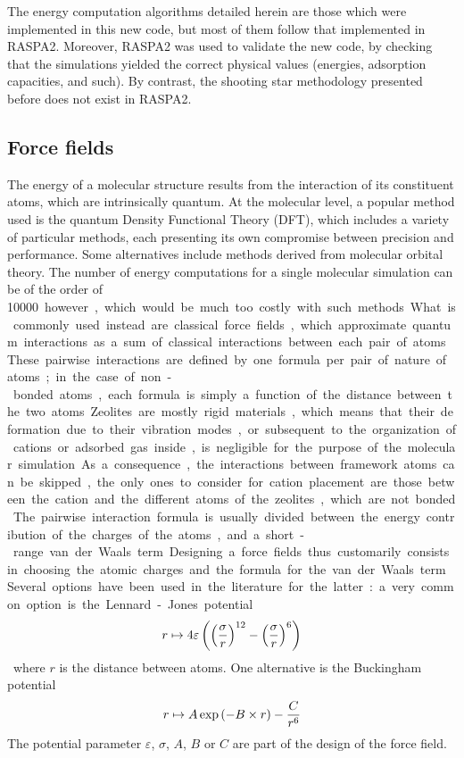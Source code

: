 \documentclass[main.tex]{subfiles}
\begin{document}
The energy computation algorithms detailed herein are those which were implemented in this new code, but most of them follow that implemented in RASPA2. Moreover, RASPA2 was used to validate the new code, by checking that the simulations yielded the correct physical values (energies, adsorption capacities, and such). By contrast, the shooting star methodology presented before does not exist in RASPA2.

\subsection{Force fields}

\label{forcefields}

The energy of a molecular structure results from the interaction of its constituent atoms, which are intrinsically quantum. At the molecular level, a popular method used is the quantum Density Functional Theory (DFT), which includes a variety of particular methods, each presenting its own compromise between precision and performance. Some alternatives include methods derived from molecular orbital theory. The number of energy computations for a single molecular simulation can be of the order of \qty{10000} however, which would be much too costly with such methods.

What is commonly used instead are classical force fields, which approximate quantum interactions as a sum of classical interactions between each pair of atoms. These pairwise interactions are defined by one formula per pair of nature of atoms; in the case of non-bonded atoms, each formula is simply a function of the distance between the two atoms. Zeolites are mostly rigid materials, which means that their deformation due to their vibration modes, or subsequent to the organization of cations or adsorbed gas inside, is negligible for the purpose of the molecular simulation. As a consequence, the interactions between framework atoms can be skipped, the only ones to consider for cation placement are those between the cation and the different atoms of the zeolites, which are not bonded.

The pairwise interaction formula is usually divided between the energy contribution of the charges of the atoms, and a short-range van der Waals term. Designing a force fields thus customarily consists in choosing the atomic charges and the formula for the van der Waals term. Several options have been used in the literature for the latter: a very common option is the Lennard-Jones potential
\[r\mapsto 4\varepsilon\left(\left(\frac \sigma r\right)^{12} - \left(\frac \sigma r\right)^6\right)\]
where $r$ is the distance between atoms. One alternative is the Buckingham potential
\[r\mapsto A\exp\left(-B\times r\right) - \frac C{r^6}\]
The potential parameter $\varepsilon$, $\sigma$, $A$, $B$ or $C$ are part of the design of the force field.
\end{document}
